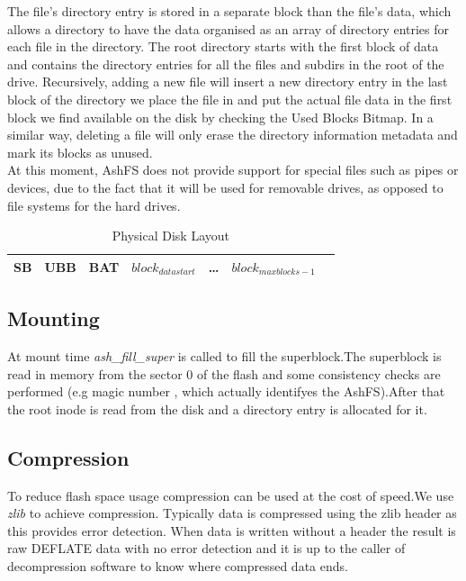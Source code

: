 \documentclass[conference]{IEEEtran}
\begin{document}
The file's directory entry is stored in a separate block than the file's data, which allows a directory to have the data organised
as an array of directory entries for each file in the directory. The root directory starts with the first block of data and contains
the directory entries for all the files and subdirs in the root of the drive. Recursively, adding a new file will insert a new directory
entry in the last block of the directory we place the file in and put the actual file data in the first block we find available on the
disk by checking the Used Blocks Bitmap. In a similar way, deleting a file will only erase the directory information metadata and mark its
blocks as unused.\\

At this moment, AshFS does not provide support for special files such as pipes
or devices, due to the fact that it will be used for removable drives, as opposed to file systems for the hard drives.\\

\begin{table}

\begin{tabular}{|c|c|c|c|c|c|c|}
\hline
SB & UBB & BAT & $block_{datastart}$ & \ldots & $block_{maxblocks-1}$\\
\hline
\end{tabular}
\caption{Physical Disk Layout}
\label{table_phys}
\end{table}



\subsection{Mounting}
At mount time {\em ash\_fill\_super} is called to fill the superblock.The superblock is read in memory
from the sector 0 of the flash and some consistency checks are performed (e.g magic number , which actually identifyes
the AshFS).After that the root inode is read from the disk and a directory entry is allocated for it.



\subsection{Compression}
To reduce flash space usage compression can be used at the cost of speed.We use {\em zlib } to achieve compression.
Typically data is compressed using the zlib header as this provides error detection. When data is written
without a header the result is raw DEFLATE data with no error detection and it is up to the caller of 
decompression software to know where compressed data ends.\\
\end{document}
